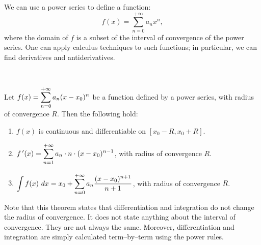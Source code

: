 We can use a power series to define a function:
$$f(x) = \sum_{n=0}^{+\infty} a_nx^n,$$
where the domain of $f$ is a subset of the interval of convergence of the power series. One can apply calculus techniques to such functions; in particular, we can find derivatives and antiderivatives. 


	\checkoddpage
{}

\begin{theorem}\label{thm:calc_power_series}
{\footnotesize $\,$}\vspace*{-0.75cm}

Let $\displaystyle f(x) = \sum_{n=0}^{+\infty} a_n(x-x_0)^n$ be a function defined by a power series, with radius of convergence $R$. Then the following hold: 
	\begin{enumerate}
		\item $f(x)$ is continuous and differentiable on $[x_0-R,x_0+R]$.
		\item	$\displaystyle f\,'(x) = \sum_{n=1}^{+\infty} a_n\cdot n\cdot (x-x_0)^{n-1}$, with radius of convergence $R$.
		\item	$\displaystyle \int f(x)\ dx = x_0+\sum_{n=0}^{+\infty} a_n\frac{(x-x_0)^{n+1}}{n+1}$, with radius of convergence $R$.
	\end{enumerate}
\end{theorem}

Note that this theorem states that differentiation and integration do not change the radius of convergence. It does not state anything about the interval of convergence. They are not always the same. Moreover, differentiation and integration are simply calculated term--by--term using the power rules.

\ifanalysis

